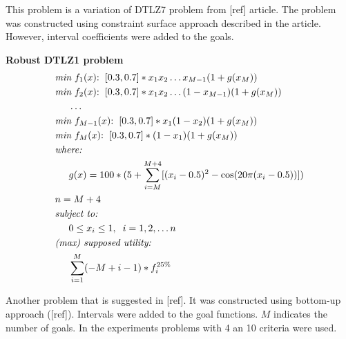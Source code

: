 \begin{description}
    This problem is a variation of DTLZ7 problem from [ref] article. The
    problem was constructed using constraint surface approach described in the
    article. However, interval coefficients were added to the goals.


  \item{\textbf{Robust DTLZ1 problem}}
    \begin{align*}
      & \textit{min}\text{ $f_1(x)$:} \hspace{0.2cm}
      [0.3, 0.7] * x_1 x_2 \dots x_{M-1}(1 + g(x_M)) \\
      & \textit{min}\text{ $f_2(x)$:} \hspace{0.2cm}
      [0.3, 0.7] * x_1 x_2 \dots (1 - x_{M-1})(1 + g(x_M)) \\
      & \hspace{0.5cm} \dots \\
      & \textit{min}\text{ $f_{M-1}(x)$:} \hspace{0.2cm}
      [0.3, 0.7] * x_1 (1 - x_2) (1 + g(x_M)) \\
      & \textit{min}\text{ $f_M(x)$:} \hspace{0.2cm}
      [0.3, 0.7] * (1 - x_1) (1 + g(x_M)) \\
      & \textit{where:} \\ 
      & \hspace{0.5cm} g(x) = 100 * (5 + \sum_{i=M}^{M+4}
        [ (x_i - 0.5)^2 - \text{cos}(20 \pi (x_i -0.5)) ])\\
      & n = M + 4 \\
      & \textit{subject to:} \\  
      & \hspace{0.5cm} 0 \le x_i \le 1, \hspace{0.2cm} i = 1, 2, \dots n \\
      & \textit{(max) supposed utility:} \\
      & \hspace{0.5cm} \sum_{i=1}^M (-M+i-1) * f_i^{25\%} 
    \end{align*}

  Another problem that is suggested in [ref]. It was constructed using
  bottom-up approach ([ref]). Intervals were added to the goal functions. $M$
  indicates the number of goals. In the experiments problems with 4 an 10 criteria
  were used.

\end{description}





